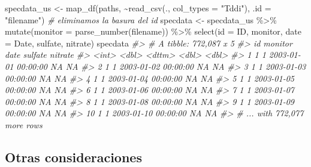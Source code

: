 \documentclass[
]{book}
\newenvironment{Shaded}{\begin{snugshade}}{\end{snugshade}}
\newcommand{\AttributeTok}[1]{\textcolor[rgb]{0.77,0.63,0.00}{#1}}
\newcommand{\CommentTok}[1]{\textcolor[rgb]{0.56,0.35,0.01}{\textit{#1}}}
\newcommand{\FunctionTok}[1]{\textcolor[rgb]{0.00,0.00,0.00}{#1}}
\newcommand{\NormalTok}[1]{#1}
\newcommand{\OtherTok}[1]{\textcolor[rgb]{0.56,0.35,0.01}{#1}}
\newcommand{\SpecialCharTok}[1]{\textcolor[rgb]{0.00,0.00,0.00}{#1}}
\newcommand{\StringTok}[1]{\textcolor[rgb]{0.31,0.60,0.02}{#1}}
\begin{document}
\begin{Shaded}
\begin{Highlighting}[]
\NormalTok{specdata\_us }\OtherTok{\textless{}{-}} \FunctionTok{map\_df}\NormalTok{(paths, }\SpecialCharTok{\textasciitilde{}}\FunctionTok{read\_csv}\NormalTok{(., }\AttributeTok{col\_types =} \StringTok{"Tddi"}\NormalTok{), }\AttributeTok{.id =} \StringTok{"filename"}\NormalTok{)}
\CommentTok{\# eliminamos la basura del id}
\NormalTok{specdata }\OtherTok{\textless{}{-}}\NormalTok{ specdata\_us }\SpecialCharTok{\%\textgreater{}\%}
  \FunctionTok{mutate}\NormalTok{(}\AttributeTok{monitor =} \FunctionTok{parse\_number}\NormalTok{(filename)) }\SpecialCharTok{\%\textgreater{}\%}
  \FunctionTok{select}\NormalTok{(}\AttributeTok{id =}\NormalTok{ ID, monitor, }\AttributeTok{date =}\NormalTok{ Date, sulfate, nitrate)}
\NormalTok{specdata}
\CommentTok{\#\textgreater{} \# A tibble: 772,087 x 5}
\CommentTok{\#\textgreater{}       id monitor date                sulfate nitrate}
\CommentTok{\#\textgreater{}    \textless{}int\textgreater{}   \textless{}dbl\textgreater{} \textless{}dttm\textgreater{}                \textless{}dbl\textgreater{}   \textless{}dbl\textgreater{}}
\CommentTok{\#\textgreater{}  1     1       1 2003{-}01{-}01 00:00:00      NA      NA}
\CommentTok{\#\textgreater{}  2     1       1 2003{-}01{-}02 00:00:00      NA      NA}
\CommentTok{\#\textgreater{}  3     1       1 2003{-}01{-}03 00:00:00      NA      NA}
\CommentTok{\#\textgreater{}  4     1       1 2003{-}01{-}04 00:00:00      NA      NA}
\CommentTok{\#\textgreater{}  5     1       1 2003{-}01{-}05 00:00:00      NA      NA}
\CommentTok{\#\textgreater{}  6     1       1 2003{-}01{-}06 00:00:00      NA      NA}
\CommentTok{\#\textgreater{}  7     1       1 2003{-}01{-}07 00:00:00      NA      NA}
\CommentTok{\#\textgreater{}  8     1       1 2003{-}01{-}08 00:00:00      NA      NA}
\CommentTok{\#\textgreater{}  9     1       1 2003{-}01{-}09 00:00:00      NA      NA}
\CommentTok{\#\textgreater{} 10     1       1 2003{-}01{-}10 00:00:00      NA      NA}
\CommentTok{\#\textgreater{} \# ... with 772,077 more rows}
\end{Highlighting}
\end{Shaded}

\hypertarget{otras-consideraciones}{%
\subsection*{Otras consideraciones}\label{otras-consideraciones}}
\end{document}
